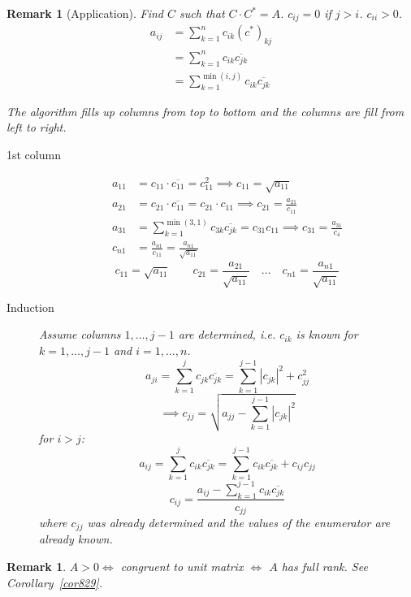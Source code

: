 \documentclass{article}
\newcounter{lecref}[section]
\numberwithin{lecref}{section}
\newtheorem{remark}[lecref]{Remark}
\newcommand{\card}[1]{\left|#1\right|}
\begin{document}
\begin{remark}[Application]
  Find $C$ such that $C \cdot C^* = A$.
  $c_{ij} = 0$ if $j > i$.
  $c_{ii} > 0$.
  \begin{align*}
    a_{ij} &= \sum_{k=1}^n c_{ik} (c^*)_{kj} \\
      &= \sum_{k=1}^n c_{ik} \overline{c_{jk}} \\
      &= \sum_{k=1}^{\min(i,j)} c_{ik} \overline{c_{jk}}
  \end{align*}

  The algorithm fills up columns from top to bottom and the columns are fill from left to right.

  \begin{description}
    \item[1st column] 
      \begin{align*}
        a_{11} &= c_{11} \cdot \overline{c_{11}} = c_{11}^2 \implies c_{11} = \sqrt{a_{11}} \\
        a_{21} &= c_{21} \cdot \overline{c_{11}} = c_{21} \cdot c_{11} \implies c_{21} = \frac{a_{21}}{c_{11}} \\
        a_{31} &= \sum_{k=1}^{\min(3,1)} c_{3k} \overline{c_{jk}} = c_{31} c_{11} \implies c_{31} = \frac{a_{31}}{c_4} \\
        c_{n1} &= \frac{a_{n1}}{c_{11}} = \frac{a_{n1}}{\sqrt{a_{11}}}
      \end{align*}
      \[ c_{11} = \sqrt{a_{11}} \qquad c_{21} = \frac{a_{21}}{\sqrt{a_{11}}} \quad \dots \quad c_{n1} = \frac{a_{n1}}{\sqrt{a_{11}}} \]
    \item[Induction]
      Assume columns $1, \dots, j-1$ are determined, i.e. $c_{ik}$ is known for $k = 1, \dots, j-1$ and $i = 1, \dots, n$.
      \[ a_{ji} = \sum_{k=1}^j c_{jk} \overline{c_{jk}} = \sum_{k=1}^{j-1} \card{c_{jk}}^2 + c_{jj}^2 \]
      \[ \implies c_{jj} = \sqrt{a_{jj} - \sum_{k=1}^{j-1} \card{c_{jk}}^2} \]
      for $i > j$:
      \[ a_{ij} = \sum_{k=1}^j  c_{ik} \overline{c_{jk}} = \sum_{k=1}^{j-1} c_{ik} \overline{c_{jk}} + c_{ij} c_{jj} \]
      \[ c_{ij} = \frac{a_{ij} - \sum_{k=1}^{j-1} c_{ik} \overline{c_{jk}}}{c_{jj}} \]
      where $c_{jj}$ was already determined and the values of the enumerator are already known.
  \end{description}
\end{remark}

\begin{remark}
  $A > 0 \iff$ congruent to unit matrix $\iff$ $A$ has full rank.
  See Corollary~\ref{cor829}.
\end{remark}
\end{document}
